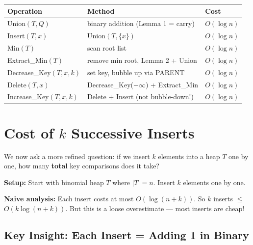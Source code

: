 \documentclass[11pt]{article}
\begin{document}
\begin{keybox}
\begin{center}
\renewcommand{\arraystretch}{1.5}
\begin{tabular}{l l l}
\textbf{\textcolor{heapblue}{Operation}} & \textbf{Method} & \textbf{Cost} \\
\hline
\textcolor{heapblue}{Union$(T, Q)$} & binary addition (Lemma 1 = carry) & \textcolor{greenO}{$O(\log n)$} \\
\textcolor{heapblue}{Insert$(T, x)$} & Union$(T, \{x\})$ & \textcolor{greenO}{$O(\log n)$} \\
\textcolor{heapblue}{Min$(T)$} & scan root list & \textcolor{greenO}{$O(\log n)$} \\
\textcolor{heapblue}{Extract\_Min$(T)$} & remove min root, Lemma 2 + Union & \textcolor{greenO}{$O(\log n)$} \\
\textcolor{heapblue}{Decrease\_Key$(T,x,k)$} & set key, bubble up via PARENT & \textcolor{greenO}{$O(\log n)$} \\
\textcolor{heapblue}{Delete$(T,x)$} & Decrease\_Key($-\infty$) + Extract\_Min & \textcolor{greenO}{$O(\log n)$} \\
\textcolor{heapblue}{Increase\_Key$(T,x,k)$} & Delete + Insert (not bubble-down!) & \textcolor{greenO}{$O(\log n)$} \\
\end{tabular}
\end{center}
\end{keybox}

\section{Cost of $k$ Successive Inserts}

We now ask a more refined question: if we insert $k$ elements into a heap $T$ one by one, how many \textbf{total} key comparisons does it take?

\textbf{Setup:} Start with binomial heap $T$ where $|T| = n$. Insert $k$ elements one by one.

\textbf{Naive analysis:} Each insert costs at most $O(\log(n+k))$. So $k$ inserts $\leq$ \textcolor{amber}{$O(k \log(n+k))$}. But this is a loose overestimate — most inserts are cheap!

\subsection{Key Insight: Each Insert = Adding 1 in Binary}
\end{document}
